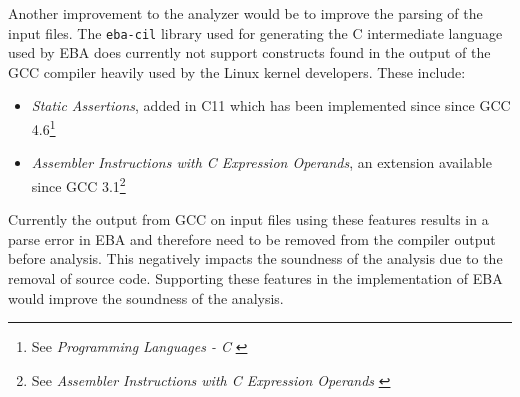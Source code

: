 \newpar Another improvement to the analyzer would be to improve the parsing of the input files. The \texttt{eba-cil} library used for generating the C intermediate language used by EBA does currently not support constructs found in the output of the GCC compiler heavily used by the Linux kernel developers. These include:
\begin{itemize}
    \item \textit{Static Assertions}, added in C11 which has been implemented since since GCC 4.6\footnote{See \textit{Programming Languages - C} \cite{ISO:2011:IIIb}}
    \item \textit{Assembler Instructions with C Expression Operands}, an extension available since GCC 3.1\footnote{See \textit{Assembler Instructions with C Expression Operands} \cite{GCC:3.1}}
\end{itemize}

\noindent Currently the output from GCC on input files using these features results in a parse error in EBA and therefore need to be removed from the compiler output before analysis. This negatively impacts the soundness of the analysis due to the removal of source code. Supporting these features in the implementation of EBA would improve the soundness of the analysis.